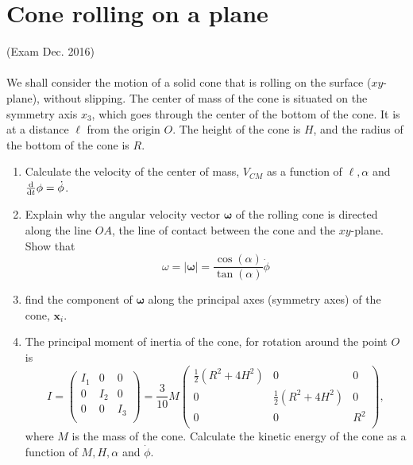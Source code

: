 \documentclass{article}
\begin{document}
    \section{Cone rolling on a plane}
    (Exam Dec. 2016) \\ \\
    We shall consider the motion of a solid cone that is rolling on the surface ($xy$-plane), without slipping. The center of mass of the cone is situated on the symmetry axis $x_3$, which goes through the center of the bottom of the cone. It is at a distance $\ell$ from the origin $O$. The height of the cone is $H$, and the radius of the bottom of the cone is $R$.
    \begin{enumerate}[label=(\alph*)]
        \item Calculate the velocity of the center of mass, $V_{CM}$ as a function of $\ell, \alpha$ and $\dv{t} \phi =\dot \phi$.
        \item Explain why the angular velocity vector $\boldsymbol \omega$ of the rolling cone is directed along the line $OA$, the line of contact between the cone and the $xy$-plane. Show that 
        \begin{equation*}
            \omega = |\boldsymbol \omega | = \frac{\cos(\alpha)}{\tan(\alpha)} \dot \phi
        \end{equation*}
        \item find the component of $\boldsymbol \omega $ along the principal axes (symmetry axes) of the cone, $\mathbf{x}_i$.
        \item The principal moment of inertia of the cone, for rotation around the point $O$ is
            \begin{equation*}
                I = 
                \begin{pmatrix}
                    I_{1} & 0 & 0 \\
                    0 & I_{2} & 0 \\
                    0 & 0 & I_{3} \\
                \end{pmatrix}
                = \frac{3}{10} M 
                \begin{pmatrix}
                    \frac{1}{2}(R^2 + 4H^2)& 0 & 0 \\
                    0 & \frac{1}{2}(R^2 + 4H^2)& 0 \\
                    0 & 0 & R^2\\
                \end{pmatrix}
                ,
            \end{equation*}
            where $M$ is the mass of the cone. Calculate the kinetic energy of the cone as a function of $M, H, \alpha$ and $\dot \phi$.
    \end{enumerate}
\end{document}
